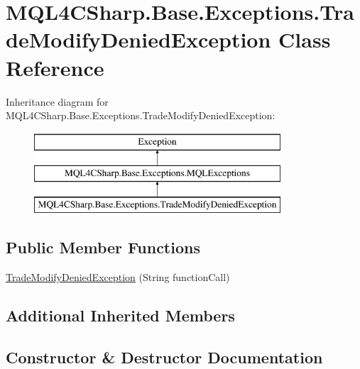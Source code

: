 \hypertarget{class_m_q_l4_c_sharp_1_1_base_1_1_exceptions_1_1_trade_modify_denied_exception}{}\section{M\+Q\+L4\+C\+Sharp.\+Base.\+Exceptions.\+Trade\+Modify\+Denied\+Exception Class Reference}
\label{class_m_q_l4_c_sharp_1_1_base_1_1_exceptions_1_1_trade_modify_denied_exception}
Inheritance diagram for M\+Q\+L4\+C\+Sharp.\+Base.\+Exceptions.\+Trade\+Modify\+Denied\+Exception\+:\begin{figure}[H]
\begin{center}
\leavevmode
\includegraphics[height=3.000000cm]{class_m_q_l4_c_sharp_1_1_base_1_1_exceptions_1_1_trade_modify_denied_exception}
\end{center}
\end{figure}
\subsection*{Public Member Functions}
\begin{DoxyCompactItemize}
\item 
\hyperlink{class_m_q_l4_c_sharp_1_1_base_1_1_exceptions_1_1_trade_modify_denied_exception_afdd738fa29543ff6befc7e27ded0d11d}{Trade\+Modify\+Denied\+Exception} (String function\+Call)
\end{DoxyCompactItemize}
\subsection*{Additional Inherited Members}


\subsection{Constructor \& Destructor Documentation}
